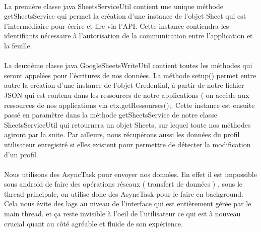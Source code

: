 \documentclass[a4paper, 10pt]{article}
\begin{document}
\paragraph{}
La première classe java SheetsServiceUtil contient une unique méthode getSheetsService qui permet la création d’une instance de l’objet Sheet qui est l'intermédiaire pour écrire et lire via l’API. Cette instance contiendra les identifiants nécessaire à l’autorisation de la communication entre l’application et la feuille.
\paragraph{}
La deuxième classe java GoogleSheetsWriteUtil contient toutes les méthodes qui seront appelées pour l’écritures de nos données. 
La méthode setup() permet entre autre la création d’une instance de l’objet Credential, à partir de notre fichier JSON qui est contenu dans les ressources de notre applications ( on accède aux ressources de nos applications via ctx.getRessourses();. Cette instance est ensuite passé en paramètre dans la méthode getSheetsService de notre classe SheetsServiceUtil qui retournera un objet Sheets, sur lequel toute nos méthodes agiront par la suite.
Par ailleurs, nous récupérons aussi les données du profil utilisateur enregistré si elles existent pour permettre de détecter la modification d’un profil.
\paragraph{}
Nous utilisons des AsyncTask pour envoyer nos données. En effet il est impossible sous android de faire des opérations réseaux ( transfert de données ) , sous le thread principale, on utilise donc des AsyncTask pour le faire en background. Cela nous évite des lags au niveau de l’interface qui est entièrement gérée par le main thread.
et ça reste invisible à l’oeil de l’utilisateur ce qui est à nouveau crucial quant au côté agréable et fluide de son expérience.
\end{document}
